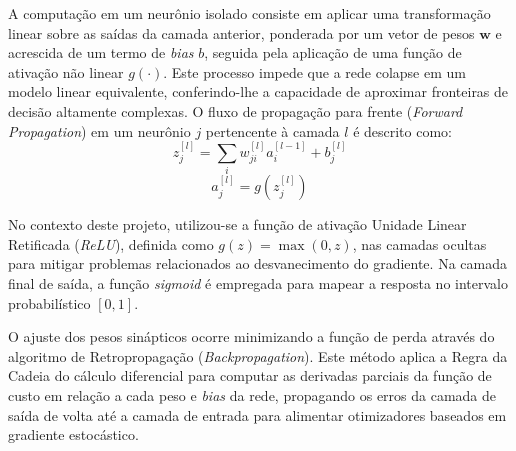 \documentclass[12pt, a4paper]{article}
\begin{document}
A computação em um neurônio isolado consiste em aplicar uma transformação linear sobre as saídas da camada anterior, ponderada por um vetor de pesos $\mathbf{w}$ e acrescida de um termo de \textit{bias} $b$, seguida pela aplicação de uma função de ativação não linear $g(\cdot)$. Este processo impede que a rede colapse em um modelo linear equivalente, conferindo-lhe a capacidade de aproximar fronteiras de decisão altamente complexas. O fluxo de propagação para frente (\textit{Forward Propagation}) em um neurônio $j$ pertencente à camada $l$ é descrito como:
\begin{equation}
z_j^{[l]} = \sum_{i} w_{ji}^{[l]} a_i^{[l-1]} + b_j^{[l]}
\end{equation}
\begin{equation}
a_j^{[l]} = g(z_j^{[l]})
\end{equation}

No contexto deste projeto, utilizou-se a função de ativação Unidade Linear Retificada (\textit{ReLU}), definida como $g(z) = \max(0, z)$, nas camadas ocultas para mitigar problemas relacionados ao desvanecimento do gradiente. Na camada final de saída, a função \textit{sigmoid} é empregada para mapear a resposta no intervalo probabilístico $[0, 1]$.

O ajuste dos pesos sinápticos ocorre minimizando a função de perda através do algoritmo de Retropropagação (\textit{Backpropagation}). Este método aplica a Regra da Cadeia do cálculo diferencial para computar as derivadas parciais da função de custo em relação a cada peso e \textit{bias} da rede, propagando os erros da camada de saída de volta até a camada de entrada para alimentar otimizadores baseados em gradiente estocástico.
\end{document}
